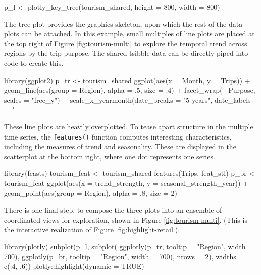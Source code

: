 \begin{Schunk}
\begin{Sinput}
p_l <- plotly_key_tree(tourism_shared, height = 800, width = 800)
\end{Sinput}
\end{Schunk}

The tree plot provides the graphics skeleton, upon which the rest of the
data plots can be attached. In this example, small multiples of line
plots are placed at the top right of Figure \ref{fig:tourism-multi} to
explore the temporal trend across regions by the trip purpose. The
shared tsibble data can be directly piped into  code to
create this.

\begin{Schunk}
\begin{Sinput}
library(ggplot2)
p_tr <- tourism_shared %
  ggplot(aes(x = Month, y = Trips)) +
  geom_line(aes(group = Region), alpha = .5, size = .4) +
  facet_wrap(~ Purpose, scales = "free_y") +
  scale_x_yearmonth(date_breaks = "5 years", date_labels = "%
\end{Sinput}
\end{Schunk}

These line plots are heavily overplotted. To tease apart structure in
the multiple time series, the \texttt{features()} function computes
interesting characteristics, including the measures of trend and
seasonality. These are displayed in the scatterplot at the bottom right,
where one dot represents one series.

\begin{Schunk}
\begin{Sinput}
library(feasts)
tourism_feat <- tourism_shared %
  features(Trips, feat_stl)
p_br <- tourism_feat %
  ggplot(aes(x = trend_strength, y = seasonal_strength_year)) +
  geom_point(aes(group = Region), alpha = .8, size = 2)
\end{Sinput}
\end{Schunk}

There is one final step, to compose the three plots into an ensemble of
coordinated views for exploration, shown in Figure
\ref{fig:tourism-multi}. (This is the interactive realization of Figure
\ref{fig:highlight-retail}).

\begin{Schunk}
\begin{Sinput}
library(plotly)
subplot(p_l,
  subplot(
    ggplotly(p_tr, tooltip = "Region", width = 700),
    ggplotly(p_br, tooltip = "Region", width = 700),
    nrows = 2),
  widths = c(.4, .6)) %
  plotly::highlight(dynamic = TRUE)
\end{Sinput}
\end{Schunk}

